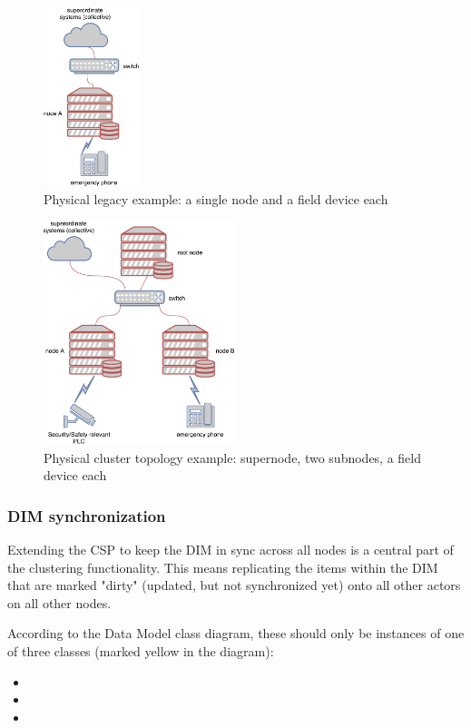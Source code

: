 \begin{figure}[]
	\center
	\includegraphics[width=0.25\textwidth]{img/topo_sl_noha.pdf}
	\caption{Physical legacy example: a single node and a field device each}
	\label{fig:topo:sl:noha}
\end{figure}
\begin{figure}[]
	\center
	\includegraphics[width=0.5\textwidth]{img/topo_ml_noha.pdf}
	\caption{Physical cluster topology example: supernode, two subnodes, a field device each}
	\label{fig:topo:ml:noha}
\end{figure}

\subsubsection{DIM synchronization}
Extending the \gls{CSP} to keep the \gls{DIM} in sync across all nodes is a central
part of the clustering functionality. This means replicating the
items within the DIM that are marked "dirty" (updated, but not synchronized yet) onto all other actors on all other nodes.

According to
the Data Model class diagram, these should only be instances of one of three
classes (marked yellow in the diagram):
\begin{itemize}
	\item {}
	\item {}
	\item {}
\end{itemize}

